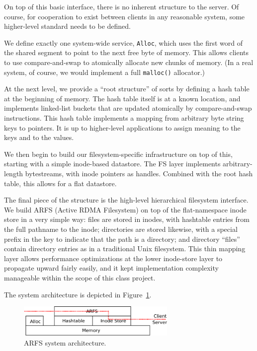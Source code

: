 \documentclass[10pt]{article}
\begin{document}
On top of this basic interface, there is no inherent structure to the
server. Of course, for cooperation to exist between clients in any
reasonable system, some higher-level standard needs to be defined.

We define exactly one system-wide service, {\tt Alloc}, which uses the
first word of the shared segment to point to the next free byte of
memory. This allows clients to use compare-and-swap to atomically
allocate new chunks of memory. (In a real system, of course, we would
implement a full {\tt malloc()} allocator.)

At the next level, we provide a ``root structure'' of sorts by
defining a hash table at the beginning of memory. The hash table
itself is at a known location, and implements linked-list buckets that
are updated atomically by compare-and-swap instructions. This hash
table implements a mapping from arbitrary byte string keys to
pointers. It is up to higher-level applications to assign meaning to
the keys and to the values.

We then begin to build our filesystem-specific infrastructure on top
of this, starting with a simple inode-based datastore. The FS layer
implements arbitrary-length bytestreams, with inode pointers as
handles. Combined with the root hash table, this allows for a flat
datastore.

The final piece of the structure is the high-level hierarchical
filesystem interface. We build ARFS (Active RDMA Filesystem) on top of
the flat-namespace inode store in a very simple way: files are stored
in inodes, with hashtable entries from the full pathname to the inode;
directories are stored likewise, with a special prefix in the key to
indicate that the path is a directory; and directory ``files'' contain
directory entries as in a traditional Unix filesystem. This thin
mapping layer allows performance optimizations at the lower
inode-store layer to propagate upward fairly easily, and it kept
implementation complexity manageable within the scope of this class
project.

The system architecture is depicted in Figure~\ref{fig:fig3}.

\begin{figure}
\centering
\includegraphics[width=3in]{fig/fig3.pdf}
\caption{ARFS system architecture.}
\label{fig:fig3}
\end{figure}
  
\end{document}
